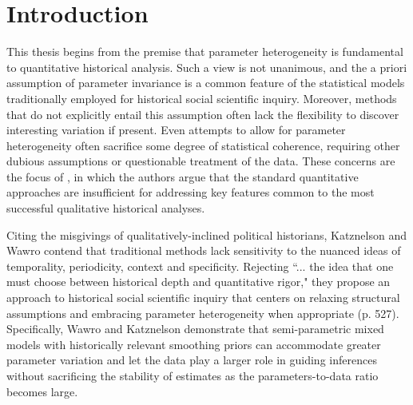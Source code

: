 \chapter{Introduction}
\label{introduction}


This thesis begins from the premise that parameter heterogeneity is fundamental to quantitative 
historical analysis. Such a view is not unanimous, and the a priori assumption of 
parameter invariance is a common feature of the statistical models traditionally employed for 
historical social scientific inquiry. Moreover, methods that do not explicitly entail this assumption 
often lack the flexibility to discover interesting variation if present. Even attempts to allow for parameter 
heterogeneity often sacrifice some degree of statistical coherence, requiring other dubious 
assumptions or questionable treatment of the data. 
These concerns are the focus of , in which the authors argue that 
the standard quantitative approaches are insufficient for addressing 
key features common to the most successful qualitative historical analyses. 


Citing the misgivings of qualitatively-inclined political historians, Katznelson and Wawro contend 
that traditional methods lack sensitivity to the nuanced ideas of temporality, periodicity, 
context and specificity. Rejecting 
``... the idea that one must choose between historical depth and quantitative rigor," 
they propose an approach to historical social scientific inquiry that centers on relaxing structural 
assumptions and embracing parameter heterogeneity when appropriate (p. 527). Specifically, 
Wawro and Katznelson demonstrate that semi-parametric mixed models with historically relevant 
smoothing priors can accommodate greater parameter variation and let the data play a larger role 
in guiding inferences without sacrificing the stability of estimates as the parameters-to-data ratio 
becomes large.  

